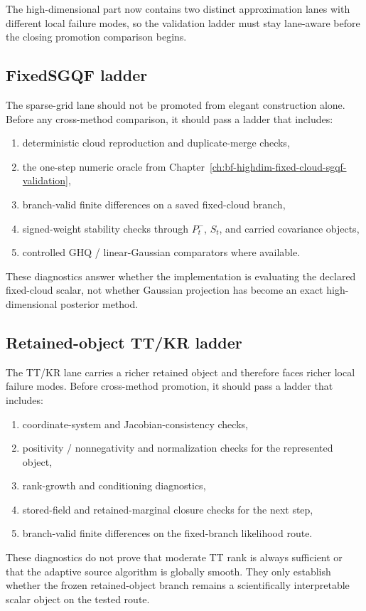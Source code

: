 The high-dimensional part now contains two distinct approximation lanes with
different local failure modes, so the validation ladder must stay lane-aware
before the closing promotion comparison begins.

\subsection{FixedSGQF ladder}
\label{sec:bf-hd-validation-sgqf-ladder}

The sparse-grid lane should not be promoted from elegant construction alone.
Before any cross-method comparison, it should pass a ladder that includes:
\begin{enumerate}[leftmargin=0.28in]
  \item deterministic cloud reproduction and duplicate-merge checks,
  \item the one-step numeric oracle from
  Chapter~\ref{ch:bf-highdim-fixed-cloud-sgqf-validation},
  \item branch-valid finite differences on a saved fixed-cloud branch,
  \item signed-weight stability checks through \(P_t^-\), \(S_t\), and carried
  covariance objects,
  \item controlled GHQ / linear-Gaussian comparators where available.
\end{enumerate}
These diagnostics answer whether the implementation is evaluating the declared
fixed-cloud scalar, not whether Gaussian projection has become an exact
high-dimensional posterior method.

\subsection{Retained-object TT/KR ladder}
\label{sec:bf-hd-validation-ttkr-ladder}

The TT/KR lane carries a richer retained object and therefore faces richer local
failure modes.  Before cross-method promotion, it should pass a ladder that
includes:
\begin{enumerate}[leftmargin=0.28in]
  \item coordinate-system and Jacobian-consistency checks,
  \item positivity / nonnegativity and normalization checks for the represented
  object,
  \item rank-growth and conditioning diagnostics,
  \item stored-field and retained-marginal closure checks for the next step,
  \item branch-valid finite differences on the fixed-branch likelihood route.
\end{enumerate}
These diagnostics do not prove that moderate TT rank is always sufficient or that
the adaptive source algorithm is globally smooth.  They only establish whether
the frozen retained-object branch remains a scientifically interpretable scalar
object on the tested route.

